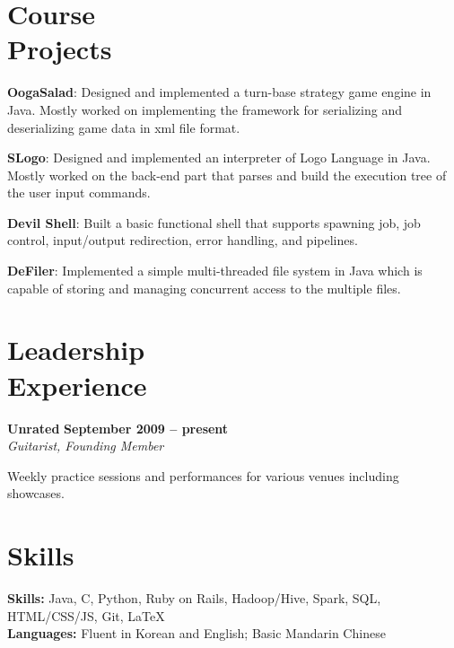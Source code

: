 \documentclass[10pt,margin,line]{resume}
\begin{document}
\begin{resume}
    \section{\mysidestyle Course\\Projects}
	\begin{list3}
        \item \textbf{OogaSalad}: Designed and implemented a turn-base strategy game engine in Java. Mostly worked on implementing the framework for serializing and deserializing game data in xml file format.\vspace{1mm}
		\item \textbf{SLogo}: Designed and implemented an interpreter of Logo Language in Java. Mostly worked on the back-end part that parses and build the execution tree of the user input commands.\vspace{1mm}
        \item \textbf{Devil Shell}: Built a basic functional shell that supports spawning job, job control, input/output redirection, error handling, and pipelines.
        \item \textbf{DeFiler}: Implemented a simple multi-threaded file system in Java which is capable of storing and managing concurrent access to the multiple files.
	\end{list3}

	\vspace{1mm}%
    \section{\mysidestyle Leadership\\Experience}

    \textbf{Unrated}  \hfill \textbf{September 2009 -- present}\vspace{0mm}\\\vspace{0mm}%
    \textsl{Guitarist, Founding Member}
    \begin{list3}
        \item Weekly practice sessions and performances for various venues including showcases.
	\end{list3}

    \section{\mysidestyle Skills}
		\textbf{Skills:} Java, C, Python, Ruby on Rails, Hadoop/Hive, Spark, SQL, HTML/CSS/JS, Git, \LaTeX\\
		\textbf{Languages:} Fluent in Korean and English; Basic Mandarin Chinese

\end{resume}
\end{document}
